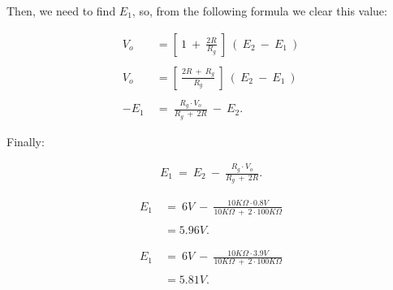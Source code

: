 Then, we need to find $E_{1}$, so, from the following formula we clear this value: \hfill \break

\begin{flushright}
{\bfseries\itshape{}} \hfill \break
\end{flushright}

\begin{ceqn}
\begin{align*}
V_{o} &=  [\ 1\ +\ \frac{2R}{R_{g}}\ ]\ (\ E_{2}\ -\ E_{1}\ ) \\ \\
V_{o} &=  [\ \frac{2R\ +\ R_{g}}{R_{g}}\ ]\ (\ E_{2}\ -\ E_{1}\ ) \\ \\
-E_{1}\ &=\ \frac{R_{g} \cdot V_{o}}{R_{g}\ +\ 2R}\ -\ E_{2}.
\end{align*}
\end{ceqn} \hfill \break

Finally:

\begin{ceqn}
\begin{align}
E_{1}\ =	\ E_{2}\ -\ \frac{R_{g} \cdot V_{o}}{R_{g}\ +\ 2R}.
\end{align}
\end{ceqn} \hfill \break

{\bfseries\itshape{}} 

\begin{ceqn}
\begin{align*}
E_{1}\ &=\ 6 V\ -\ \frac{10K\Omega \cdot 0.8 V}{10K\Omega\ +\ 2 \cdot 100K\Omega} \\ \\
&= 5.96 V.
\end{align*}
\end{ceqn} \hfill \break

{\bfseries\itshape{}} 

\begin{ceqn}
\begin{align*}
E_{1}\ &=\ 6 V\ -\ \frac{10K\Omega \cdot 3.9 V}{10K\Omega\ +\ 2 \cdot 100K\Omega} \\ \\
&= 5.81 V.
\end{align*}
\end{ceqn} \hfill \break

